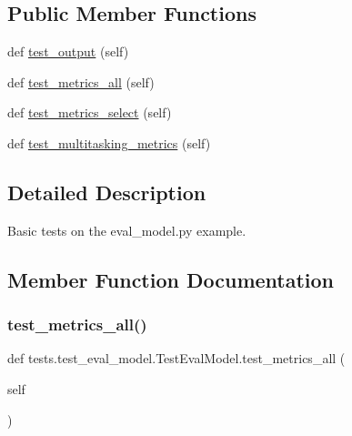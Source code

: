 \subsection*{Public Member Functions}
\begin{DoxyCompactItemize}
\item 
def \hyperlink{classtests_1_1test__eval__model_1_1TestEvalModel_a899d6a41fb8f56be62a7145d9937ee52}{test\+\_\+output} (self)
\item 
def \hyperlink{classtests_1_1test__eval__model_1_1TestEvalModel_a35d01001a5c2f289c98b384e1a53e515}{test\+\_\+metrics\+\_\+all} (self)
\item 
def \hyperlink{classtests_1_1test__eval__model_1_1TestEvalModel_a7b7b27f681704f217f711b04311977c2}{test\+\_\+metrics\+\_\+select} (self)
\item 
def \hyperlink{classtests_1_1test__eval__model_1_1TestEvalModel_a06987267bf1d5f021f3ddcbe489a820f}{test\+\_\+multitasking\+\_\+metrics} (self)
\end{DoxyCompactItemize}


\subsection{Detailed Description}
\begin{DoxyVerb}Basic tests on the eval_model.py example.
\end{DoxyVerb}
 

\subsection{Member Function Documentation}
\mbox{\label{classtests_1_1test__eval__model_1_1TestEvalModel_a35d01001a5c2f289c98b384e1a53e515}} 
\subsubsection{\texorpdfstring{test\+\_\+metrics\+\_\+all()}{test\_metrics\_all()}}
{\footnotesize\ttfamily def tests.\+test\+\_\+eval\+\_\+model.\+Test\+Eval\+Model.\+test\+\_\+metrics\+\_\+all (\begin{DoxyParamCaption}\item[{}]{self }\end{DoxyParamCaption})}

